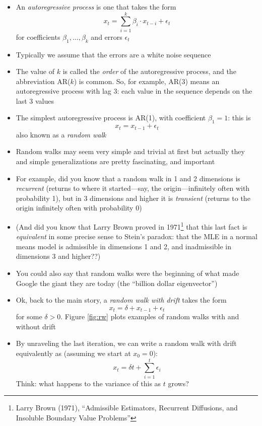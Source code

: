 \documentclass{article}
\begin{document}
\begin{itemize}
\item An \emph{autoregressive process} is one that takes the form  
  \[
  x_t = \sum_{i=1}^k \beta_i \cdot x_{t-i} + \epsilon_t
  \]
  for coefficients $\beta_1,\dots,\beta_k$ and errors $\epsilon_t$

\item Typically we assume that the errors are a white noise sequence

\item The value of $k$ is called the \emph{order} of the autoregressive process,
  and the abbreviation AR($k$) is common. So, for example, AR(3) means an
  autoregressive process with lag 3: each value in the sequence depends on the  
  last 3 values

\item The simplest autoregressive process is AR(1), with coefficient $\beta_1 =
  1$: this is  
  \[
  x_t = x_{t-1} + \epsilon_t
  \]
  also known as a \emph{random walk}

\item Random walks may seem very simple and trivial at first but actually they
  and simple generalizations are pretty fascinating, and important

\item For example, did you know that a random walk in 1 and 2 dimensions is 
  \emph{recurrent} (returns to where it started---say, the origin---infinitely
  often with probability 1), but in 3 dimensions and higher it is
  \emph{transient} (returns to the origin infinitely often with probability 0) 

\item (And did you know that Larry Brown proved in 1971\footnote{Larry Brown
    (1971), ``Admissible Estimators, Recurrent Diffusions, and Insoluble
    Boundary Value Problems''} 
  that this last fact is \emph{equivalent} in some precise sense to Stein's
  paradox: that the MLE in a normal means model is admissible in dimensions 1
  and 2, and inadmissible in dimensions 3 and higher??)    

\item You could also say that random walks were the beginning of what made
  Google the giant they are today (the ``billion dollar eigenvector'')

\item Ok, back to the main story, a \emph{random walk with drift} takes the form   
  \[
  x_t = \delta + x_{t-1} + \epsilon_t
  \]
  for some $\delta > 0$. Figure \ref{fig:rw} plots examples of random walks with
  and without drift 

\item By unraveling the last iteration, we can write a random walk with drift
  equivalently as (assuming we start at $x_0 = 0$):
  \[
  x_t = \delta t + \sum_{i=1}^t \epsilon_i 
  \]
  Think: what happens to the variance of this as $t$ grows?
\end{itemize}
\end{document}
